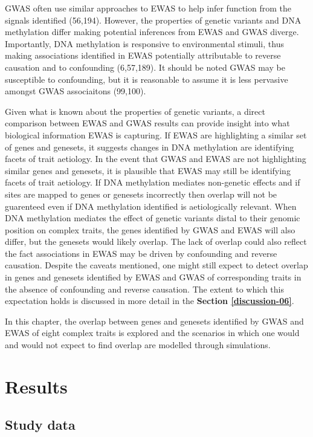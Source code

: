 \documentclass[11pt,oneside]{bristolthesis}
\begin{document}
GWAS often use similar approaches to EWAS to help infer function from the signals identified (56,194). However, the properties of genetic variants and DNA methylation differ making potential inferences from EWAS and GWAS diverge. Importantly, DNA methylation is responsive to environmental stimuli, thus making associations identified in EWAS potentially attributable to reverse causation and to confounding (6,57,189). It should be noted GWAS may be susceptible to confounding, but it is reasonable to assume it is less pervasive amongst GWAS associaitons (99,100).

Given what is known about the properties of genetic variants, a direct comparison between EWAS and GWAS results can provide insight into what biological information EWAS is capturing. If EWAS are highlighting a similar set of genes and genesets, it suggests changes in DNA methylation are identifying facets of trait aetiology. In the event that GWAS and EWAS are not highlighting similar genes and genesets, it is plausible that EWAS may still be identifying facets of trait aetiology. If DNA methylation mediates non-genetic effects and if sites are mapped to genes or genesets incorrectly then overlap will not be guarenteed even if DNA methylation identified is aetiologically relevant. When DNA methylation mediates the effect of genetic variants distal to their genomic position on complex traits, the genes identified by GWAS and EWAS will also differ, but the genesets would likely overlap. The lack of overlap could also reflect the fact associations in EWAS may be driven by confounding and reverse causation. Despite the caveats mentioned, one might still expect to detect overlap in genes and genesets identified by EWAS and GWAS of corresponding traits in the absence of confounding and reverse causation. The extent to which this expectation holds is discussed in more detail in the \textbf{Section \ref{discussion-06}}.

In this chapter, the overlap between genes and genesets identified by GWAS and EWAS of eight complex traits is explored and the scenarios in which one would and would not expect to find overlap are modelled through simulations.

\hypertarget{results-06}{%
\section{Results}\label{results-06}}

\hypertarget{study-data}{%
\subsection{Study data}\label{study-data}}
\end{document}
